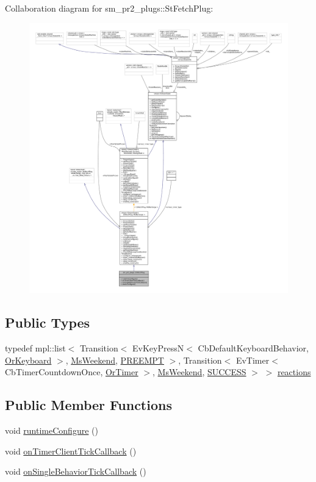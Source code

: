 Collaboration diagram for sm\+\_\+pr2\+\_\+plugs\+:\+:St\+Fetch\+Plug\+:
\nopagebreak
\begin{figure}[H]
\begin{center}
\leavevmode
\includegraphics[width=350pt]{structsm__pr2__plugs_1_1StFetchPlug__coll__graph}
\end{center}
\end{figure}
\subsection*{Public Types}
\begin{DoxyCompactItemize}
\item 
typedef mpl\+::list$<$ Transition$<$ Ev\+Key\+PressN$<$ Cb\+Default\+Keyboard\+Behavior, \hyperlink{classsm__pr2__plugs_1_1OrKeyboard}{Or\+Keyboard} $>$, \hyperlink{classsm__pr2__plugs_1_1MsWeekend}{Ms\+Weekend}, \hyperlink{classPREEMPT}{P\+R\+E\+E\+M\+PT} $>$, Transition$<$ Ev\+Timer$<$ Cb\+Timer\+Countdown\+Once, \hyperlink{classsm__pr2__plugs_1_1OrTimer}{Or\+Timer} $>$, \hyperlink{classsm__pr2__plugs_1_1MsWeekend}{Ms\+Weekend}, \hyperlink{classSUCCESS}{S\+U\+C\+C\+E\+SS} $>$ $>$ \hyperlink{structsm__pr2__plugs_1_1StFetchPlug_aa834b55cd5b7f1d8056ad8094025fe1f}{reactions}
\end{DoxyCompactItemize}
\subsection*{Public Member Functions}
\begin{DoxyCompactItemize}
\item 
void \hyperlink{structsm__pr2__plugs_1_1StFetchPlug_ab366cd931391170e7c7fa3e591c66d73}{runtime\+Configure} ()
\item 
void \hyperlink{structsm__pr2__plugs_1_1StFetchPlug_aaf8460a7e96dfbfe7eefbd3f2fd41b41}{on\+Timer\+Client\+Tick\+Callback} ()
\item 
void \hyperlink{structsm__pr2__plugs_1_1StFetchPlug_ae3dc2c0827bd1adb046f000e1caa4c4c}{on\+Single\+Behavior\+Tick\+Callback} ()
\end{DoxyCompactItemize}
